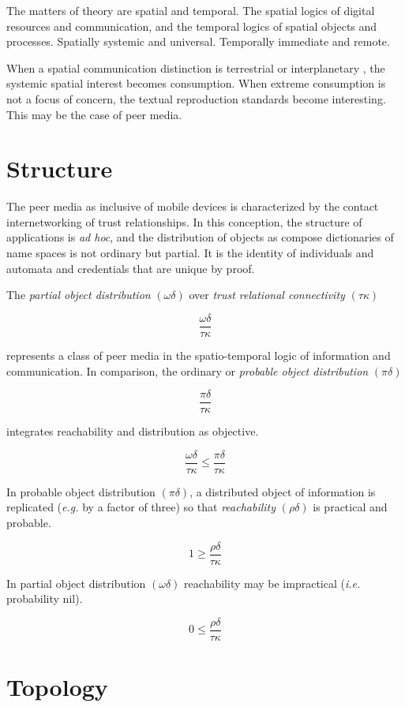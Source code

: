 \documentclass[12pt,twocolumn]{article}
\begin{document}
The matters of theory are spatial and temporal.  The spatial logics of
digital resources and communication, and the temporal logics of
spatial objects and processes.  Spatially systemic and universal.
Temporally immediate and remote.

When a spatial communication distinction is terrestrial or
interplanetary \cite{RFC5050}, the systemic spatial interest becomes
consumption.  When extreme consumption is not a focus of concern, the
textual reproduction standards become interesting.  This may be the
case of peer media.

\section{Structure}

The peer media as inclusive of mobile devices is characterized by the
contact internetworking of trust relationships.  In this conception,
the structure of applications is {\it ad hoc}, and the distribution of
objects as compose dictionaries of name spaces is not ordinary but
partial.  It is the identity of individuals and automata and
credentials that are unique by proof.

The {\it partial object distribution} \((\omega\delta)\) over {\it trust relational connectivity} \((\tau\kappa)\) 

$$
 \frac{\omega\delta}{\tau\kappa}
$$

represents a class of peer media in the spatio-temporal logic of
information and communication.  In comparison, the ordinary or {\it
  probable object distribution} \((\pi\delta)\)

$$
 \frac{\pi\delta}{\tau\kappa}
$$

integrates reachability and distribution as objective.

$$
 \frac{\omega\delta}{\tau\kappa} \le \frac{\pi\delta}{\tau\kappa}
$$

In probable object distribution \((\pi\delta)\), a distributed object
of information is replicated ({\it e.g.} by a factor of three) so that
{\it reachability} \((\rho\delta)\) is practical and probable.

$$
 1 \ge \frac{\rho\delta}{\tau\kappa}
$$

In partial object distribution \((\omega\delta)\) reachability may be
impractical ({\it i.e.} probability nil).

$$
 0 \le \frac{\rho\delta}{\tau\kappa}
$$

\section{Topology}
\end{document}
